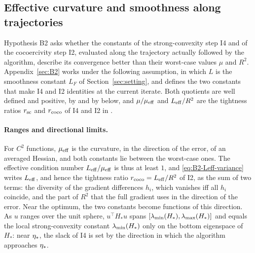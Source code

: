 \subsection{Effective curvature and smoothness along trajectories}\label{sec:th-B2}

Hypothesis B2 asks whether the constants of the strong-convexity step I4 and of the cocoercivity step I2, evaluated
along the trajectory actually followed by the algorithm, describe its convergence better than their worst-case values
$\mu$ and $R^2$. Appendix~\ref{sec:B2} works under the following assumption, in which $L$ is the smoothness constant $L_F$
of Section~\ref{sec:setting}, and defines the two constants that make I4 and I2 identities at the current iterate.
Both quotients are well defined and positive, by  and by  below, and
$\mu/\mu_{\mathrm{eff}}$ and $L_{\mathrm{eff}}/R^2$ are the tightness ratios $r_{\rm sc}$ and $r_{\rm coco}$ of I4 and I2 in .

\paragraph{Ranges and directional limits.}
For $C^2$ functions, $\mu_{\mathrm{eff}}$ is the curvature, in the direction of the error, of an averaged Hessian, and both constants
lie between the worst-case ones.
The effective condition number $L_{\mathrm{eff}}/\mu_{\mathrm{eff}}$ is thus at least $1$, and \eqref{eq:B2-Leff-variance} writes $L_{\mathrm{eff}}$, and
hence the tightness ratio $r_{\rm coco}=L_{\mathrm{eff}}/R^2$ of I2, as the sum of two terms: the diversity of the gradient
differences $h_i$, which vanishes iff all $h_i$ coincide, and the part of $R^2$ that the full gradient uses in the
direction of the error. Near the optimum, the two constants become functions of this direction.
As $u$ ranges over the unit sphere, $u^\top H_\ast u$ spans $[\lambda_{\min}(H_\ast),\lambda_{\max}(H_\ast)]$ and equals the local
strong-convexity constant $\lambda_{\min}(H_\ast)$ only on the bottom eigenspace of $H_\ast$: near $\eta_\ast$, the slack of I4 is
set by the direction in which the algorithm approaches $\eta_\ast$.

